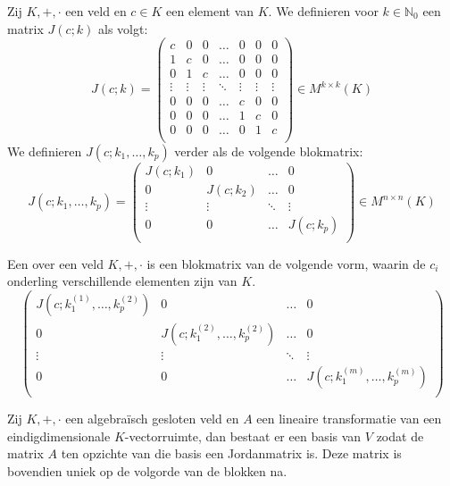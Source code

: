 \documentclass[main.tex]{subfiles}
\begin{document}
\begin{de}
  Zij $K,+,\cdot$ een veld en $c\in K$ een element van $K$.
  We definieren voor $k\in \mathbb{N}_{0}$ een matrix $J(c;k)$ als volgt:
  \[
  J(c;k) = 
  \begin{pmatrix}
    c & 0 & 0 & \hdots & 0 & 0 & 0\\
    1 & c & 0 & \hdots & 0 & 0 & 0\\
    0 & 1 & c & \hdots & 0 & 0 & 0\\
    \vdots & \vdots & \vdots & \ddots & \vdots & \vdots & \vdots\\
    0 & 0 & 0 & \hdots & c & 0 & 0\\
    0 & 0 & 0 & \hdots & 1 & c & 0\\
    0 & 0 & 0 & \hdots & 0 & 1 & c\\
  \end{pmatrix}
  \in M^{k\times k}(K)
  \]
  We definieren $J(c;k_{1},\dotsc,k_{p})$ verder als de volgende blokmatrix:
  \[
  J(c;k_{1},\dotsc,k_{p}) = 
  \begin{pmatrix}
    J(c;k_{1}) & 0 & \hdots & 0\\
    0 & J(c;k_{2}) & \hdots & 0\\
    \vdots & \vdots & \ddots & \vdots\\
    0 & 0 & \hdots & J(c;k_{p})\\
  \end{pmatrix}
  \in M^{n\times n}(K)
  \]
\end{de}

\begin{de}
  Een  over een veld $K,+,\cdot$ is een blokmatrix van de volgende vorm, waarin de $c_{i}$ onderling verschillende elementen zijn van $K$.
  \[
  \begin{pmatrix}
    J(c;k_{1}^{(1)},\dotsc,k_{p}^{(2)}) & 0 & \hdots & 0\\
    0 & J(c;k_{1}^{(2)},\dotsc,k_{p}^{(2)}) & \hdots & 0\\
    \vdots & \vdots & \ddots & \vdots\\
    0 & 0 & \hdots & J(c;k_{1}^{(m)},\dotsc,k_{p}^{(m)})\\
  \end{pmatrix}
  \]
\end{de}

\begin{st}
  Zij $K,+,\cdot$ een algebra\"isch gesloten veld en $A$ een lineaire transformatie van een eindigdimensionale $K$-vectorruimte, dan bestaat er een basis van $V$ zodat de matrix $A$ ten opzichte van die basis een Jordanmatrix is.
  Deze matrix is bovendien uniek op de volgorde van de blokken na.
\end{st}
\end{document}
